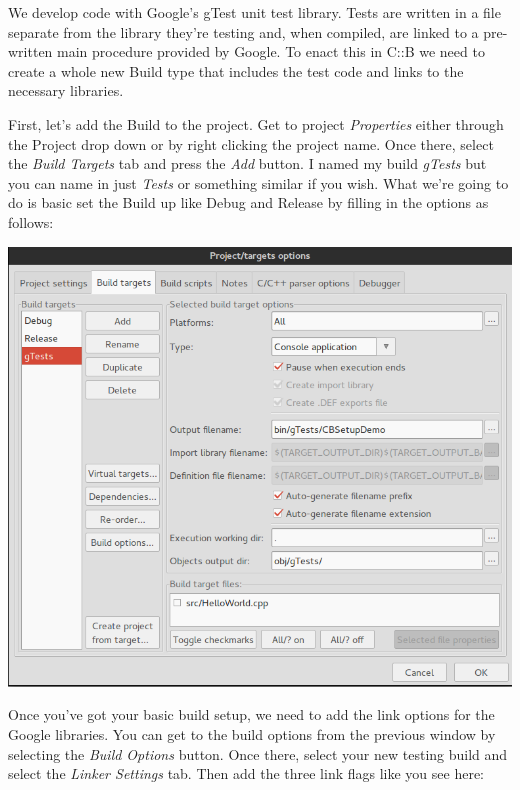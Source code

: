 \documentclass[10pt]{article}
\begin{document}
We develop code with Google's gTest unit test library. Tests are written in a file separate from the library they're testing and, when compiled, are linked to a pre-written main procedure provided by Google. To enact this in C::B we need to create a whole new Build type that includes the test code and links to the necessary libraries. 

First, let's add the Build to the project. Get to project \textit{Properties} either through the Project drop down or by right clicking the project name. Once there, select the \textit{Build Targets} tab and press the \textit{Add} button. I named my build \textit{gTests} but you can name in just \textit{Tests} or something similar if you wish.  What we're going to do is basic set the Build up like Debug and Release by filling in the options as follows:

\vspace{.1in}
\begin{center}
\includegraphics[scale=.5]{CB_TestBuildSetup.png}
\end{center}
\vspace{.1in}

Once you've got your basic build setup, we need to add the link options for the Google libraries. You can get to the build options from the previous window by selecting the \textit{Build Options} button.  Once there, select your new testing build and select the \textit{Linker Settings} tab.  Then add the three link flags like you see here:
\end{document}
